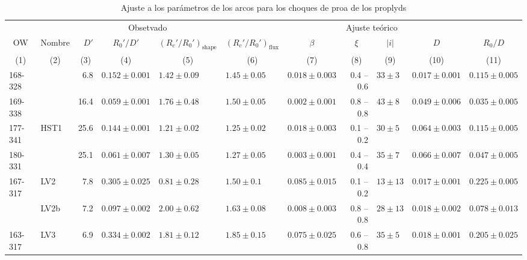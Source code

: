 \begin{table}
  \caption{Ajuste a los parámetros de los arcos para los choques de proa de los proplyds}
  \label{tab:arc-fits} 
\newcommand\C[1]{\multicolumn{1}{c}{#1}}
\begin{tabular}{llrllllrlll}\toprule
             &          & \multicolumn{3}{c}{\dotfill Obsetvado \dotfill}              & \multicolumn{6}{c}{\dotfill Ajuste teórico \dotfill} \\ 
  \C{OW}     & \C{Nombre} & \(D'\) &\C{ \(R_0'/D'\) }&\C{ \((R_c'/R_0')_{\mathrm{shape}}\) }&\C{ \((R_c'/R_0')_{\mathrm{flux}}\) }&\C{ \(\beta\) }&\C{ \(\xi\) }&\C{ \(|i|\) }&\C{ \(D\) }&\C{ \(R_0/D\)}\\
  \C{(1)}& \C{ (2) }&\C{ (3)    }&\C{    (4)      }&\C{              (5)           }&\C{           (6)             }&\C{     (7)   }&\C{   (8)   }&\C{   (9) }&\C{  (10) }&\C{   (11)} \\
\midrule     
 168-328  &            &    6.8  &  $0.152 \pm 0.001$  &  $1.42 \pm 0.09$   &  $1.45 \pm 0.05$     &  $0.018 \pm 0.003$  &  0.4 -- 0.6  &  $33 \pm 3$   &  $0.017 \pm 0.001$  &  $0.115 \pm 0.005$  \\
 169-338  &            &  16.4  &  $0.059 \pm 0.001$  &  $1.76 \pm 0.48$   &  $1.50 \pm 0.05$     &  $0.002 \pm 0.001$  &  0.8 -- 0.8  &  $43 \pm 8$   &  $0.049 \pm 0.006$  &  $0.035 \pm 0.005$  \\
 177-341  & HST1   & 25.6  &  $0.144 \pm 0.001$  &  $1.21 \pm 0.02$   &  $1.25 \pm 0.02$     &  $0.018 \pm 0.003$  &  0.1 -- 0.2  &  $30 \pm 5$   &  $0.064 \pm 0.003$  &  $0.115 \pm 0.005$  \\
 180-331  &             &  25.1  &  $0.061 \pm 0.007$  &  $1.30 \pm 0.05$   &  $1.27 \pm 0.05$     &  $0.003 \pm 0.001$  &  0.4 -- 0.4  &  $35 \pm 7$   &  $0.066 \pm 0.007$  &  $0.047 \pm 0.005$  \\
 167-317  &  LV2     &    7.8  &  $0.305 \pm 0.025$  &  $0.81 \pm 0.28$   &  $1.50 \pm 0.1$      &  $0.085 \pm 0.015$  &  0.1 -- 0.2  &  $13 \pm 13$  &  $0.017 \pm 0.001$  &  $0.225 \pm 0.005$  \\
               & LV2b    &   7.2  &  $0.097 \pm 0.002$  &  $2.00 \pm 0.62$   &  $1.63 \pm 0.08$     &  $0.008 \pm 0.003$  &  0.8 -- 0.8  &  $28 \pm 13$  &  $0.018 \pm 0.002$  &  $0.078 \pm 0.013$  \\
 163-317  & LV3      &   6.9  &  $0.334 \pm 0.002$  &  $1.81 \pm 0.12$   &  $1.85 \pm 0.15$     &  $0.075 \pm 0.025$  &  0.6 -- 0.8  &  $35 \pm 5$   &  $0.018 \pm 0.001$  &  $0.205 \pm 0.025$  \\

\end{tabular}
\end{table}
